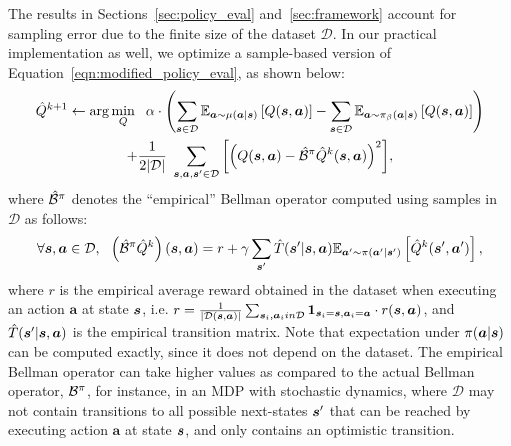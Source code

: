 The results in Sections~\ref{sec:policy_eval} and~\ref{sec:framework} account for sampling error due to the finite size of the dataset $\mathcal{D}$. In our practical implementation as well, we optimize a sample-based version of Equation~\ref{eqn:modified_policy_eval}, as shown below:
\begin{multline}
    \small{\hat{Q}^{k+1} \leftarrow \arg\min_{Q}~~ \alpha \cdot \left(\sum_{\boldsymbol{s}\in \mathcal{D}} \mathbb{E}_{\boldsymbol{a} \sim \mu(\boldsymbol{a}|\boldsymbol{s})}\left[Q(\boldsymbol{s}, \boldsymbol{a})\right] - {\sum_{\boldsymbol{s}\in \mathcal{D}} \mathbb{E}_{\boldsymbol{a} \sim {\pi_\beta}(\boldsymbol{a}|\boldsymbol{s})}\left[Q(\boldsymbol{s}, \boldsymbol{a})\right]} \right)} \\
    \small{+ \frac{1}{2 |\mathcal{D}|}~ \sum_{\boldsymbol{s}, \boldsymbol{a}, \boldsymbol{s}' \in \mathcal{D}}\left[\left(Q(\boldsymbol{s}, \boldsymbol{a}) - \hat{\mathcal{B}}^\pi\hat{Q}^{k} (\boldsymbol{s}, \boldsymbol{a}) \right)^2 \right]},
    \label{eqn:sampled_policy_eval}
\end{multline}
where $\hat{\mathcal{B}}^\pi$ denotes the ``empirical'' Bellman operator computed using samples in $\mathcal{D}$ as follows:
\begin{equation}
\label{eqn:app_empirical_bellman}
    \forall \boldsymbol{s}, \boldsymbol{a} \in \mathcal{D}, ~~ \left(\hat{\mathcal{B}}^\pi \hat{Q}^k \right)(\boldsymbol{s}, \boldsymbol{a}) = r + \gamma \sum_{\boldsymbol{s}'} \hat{T}(\boldsymbol{s}'|\boldsymbol{s}, \boldsymbol{a}) \mathbb{E}_{\boldsymbol{a}' \sim \pi(\boldsymbol{a}'|\boldsymbol{s}')}\left[\hat{Q}^k(\boldsymbol{s}' , \boldsymbol{a}')\right],  
\end{equation}
where $r$ is the empirical average reward obtained in the dataset when executing an action $\mathbf{a}$ at state $\boldsymbol{s}$, i.e. \mbox{$r = \frac{1}{|\mathcal{D}(\boldsymbol{s}, \boldsymbol{a})|} \sum_{\boldsymbol{s}_i, \boldsymbol{a}_i in \mathcal{D}} \boldsymbol{1}_{\boldsymbol{s}_i = \boldsymbol{s}, \boldsymbol{a}_i = \boldsymbol{a}} \cdot r(\boldsymbol{s}, \boldsymbol{a})$}, and $\hat{T}(\boldsymbol{s}'|\boldsymbol{s}, \boldsymbol{a})$ is the empirical transition matrix.
Note that expectation under $\pi(\boldsymbol{a}|\boldsymbol{s})$ can be computed exactly, since it does not depend on the dataset. The empirical Bellman operator can take higher values as compared to the actual Bellman operator, $\mathcal{B}^\pi$, for instance, in an MDP with stochastic dynamics, where $\mathcal{D}$ may not contain transitions to all possible next-states $\boldsymbol{s}'$ that can be reached by executing action $\mathbf{a}$ at state $\boldsymbol{s}$, and only contains an optimistic transition. 

